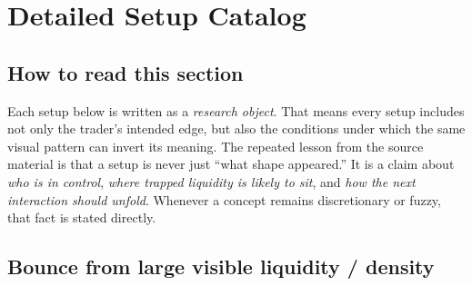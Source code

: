 \section{Detailed Setup Catalog}

\subsection{How to read this section}

Each setup below is written as a \emph{research object}. That means every setup includes not only the trader's intended edge, but also the conditions under which the same visual pattern can invert its meaning. The repeated lesson from the source material is that a setup is never just ``what shape appeared.'' It is a claim about \emph{who is in control}, \emph{where trapped liquidity is likely to sit}, and \emph{how the next interaction should unfold}. Whenever a concept remains discretionary or fuzzy, that fact is stated directly.

\subsection{Bounce from large visible liquidity / density}

